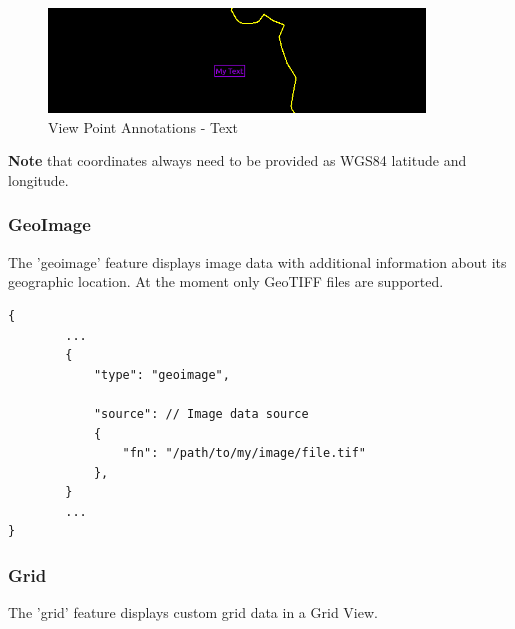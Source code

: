 \begin{figure}[H]
    \center
        \includegraphics[width=10cm]{figures/viewpoints_anno_example_text.png}
    \caption{View Point Annotations - Text} 
\end{figure}

\textbf{Note} that coordinates always need to be provided as WGS84 latitude and longitude. \\

\subsubsection{GeoImage} The 'geoimage' feature displays image data with additional information about its geographic location.
At the moment only GeoTIFF files are supported.

\begin{lstlisting}[basicstyle=\small\ttfamily]
{
        ...
        {
            "type": "geoimage",

            "source": // Image data source
            {
                "fn": "/path/to/my/image/file.tif"
            },
        }
        ...
}
\end{lstlisting}



\subsubsection{Grid} The 'grid' feature displays custom grid data in a Grid View.

